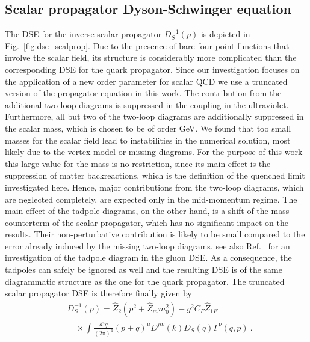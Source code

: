 \documentclass[final,twocolumn,merge,sort&compress]{elsarticle}
\begin{document}
\subsection{Scalar propagator Dyson-Schwinger equation\\}
\label{sec:DSE_scalprop}



The DSE for the inverse scalar propagator $D^{-1}_S(p)$ is depicted in
Fig.~\ref{fig:dse_scalprop}. Due to the presence of bare four-point
functions that involve the scalar field, its structure is considerably
more complicated than the corresponding DSE for the quark propagator.
Since our investigation focuses on the application of a new order
parameter for scalar QCD we use a truncated version of the propagator
equation in this work. The contribution from the additional two-loop
diagrams is suppressed in the coupling in the
ultraviolet. Furthermore, all but two of the two-loop diagrams are
additionally suppressed in the scalar mass, which is chosen to be of
order GeV. We found that too small masses
for the scalar field lead to instabilities in the numerical solution, most likely 
due to the vertex model or missing diagrams. For the purpose of this
work this large value for the mass is no restriction, since its main effect is the suppression
of matter backreactions, which is the definition of the quenched limit investigated
here.
Hence, major contributions from the two-loop diagrams,
which are neglected completely, are expected only in the mid-momentum
regime.  The main effect of the tadpole diagrams, on the other hand,
is a shift of the mass counterterm of the scalar propagator, which has
no significant impact on the results. Their non-perturbative
contribution is likely to be small compared to the error already
induced by the missing two-loop diagrams, see also
Ref.~\cite{Huber:2014tva} for an investigation of the tadpole diagram
in the gluon DSE. As a consequence, the tadpoles can safely be ignored
as well and the resulting DSE is of the same diagrammatic structure as
the one for the quark propagator.  The truncated scalar propagator DSE
is therefore finally given by
\begin{equation}
\label{eq:scalprop_dse}
\begin{split}
  & D_S^{-1} (p) = \hat{Z}_2\left(p^2+\hat{Z}_m m_0^2\right) - g^2C_F\hat{Z}_{1F} \\
  & \quad\times \int\frac{d^4q}{(2\pi)^4}\left(p+q\right)^\mu
  {D}^{\mu\nu}(k){D}_S(q) {\Gamma}^\nu(q,p) \ .
\end{split}
\end{equation}
\end{document}
